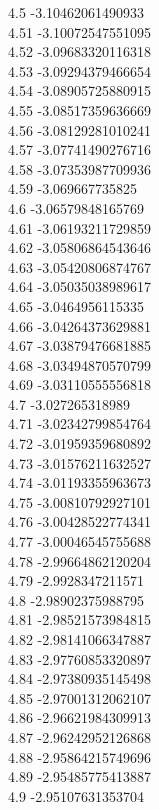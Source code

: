 {4.5	-3.10462061490933\\
4.51	-3.10072547551095\\
4.52	-3.09683320116318\\
4.53	-3.09294379466654\\
4.54	-3.08905725880915\\
4.55	-3.08517359636669\\
4.56	-3.08129281010241\\
4.57	-3.07741490276716\\
4.58	-3.07353987709936\\
4.59	-3.069667735825\\
4.6	-3.06579848165769\\
4.61	-3.06193211729859\\
4.62	-3.05806864543646\\
4.63	-3.05420806874767\\
4.64	-3.05035038989617\\
4.65	-3.0464956115335\\
4.66	-3.04264373629881\\
4.67	-3.03879476681885\\
4.68	-3.03494870570799\\
4.69	-3.03110555556818\\
4.7	-3.027265318989\\
4.71	-3.02342799854764\\
4.72	-3.01959359680892\\
4.73	-3.01576211632527\\
4.74	-3.01193355963673\\
4.75	-3.00810792927101\\
4.76	-3.00428522774341\\
4.77	-3.00046545755688\\
4.78	-2.99664862120204\\
4.79	-2.9928347211571\\
4.8	-2.98902375988795\\
4.81	-2.98521573984815\\
4.82	-2.98141066347887\\
4.83	-2.97760853320897\\
4.84	-2.97380935145498\\
4.85	-2.97001312062107\\
4.86	-2.96621984309913\\
4.87	-2.96242952126868\\
4.88	-2.95864215749696\\
4.89	-2.95485775413887\\
4.9	-2.95107631353704\\
}
